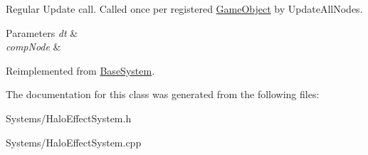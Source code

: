 Regular Update call. Called once per registered \hyperlink{classGameObject}{Game\+Object} by Update\+All\+Nodes. 


\begin{DoxyParams}{Parameters}
{\em dt} & \\
\hline
{\em comp\+Node} & \\
\hline
\end{DoxyParams}


Reimplemented from \hyperlink{classBaseSystem_a465191589a1ef8b8f3a8e20fa4656d47}{Base\+System}.



The documentation for this class was generated from the following files\+:\begin{DoxyCompactItemize}
\item 
Systems/Halo\+Effect\+System.\+h\item 
Systems/Halo\+Effect\+System.\+cpp\end{DoxyCompactItemize}

